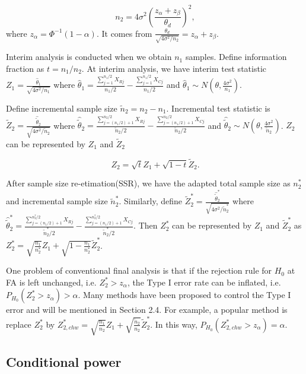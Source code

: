 \documentclass[12pt]{article}
\begin{document}
$$n_2=4\sigma^2(\frac{z_{\alpha}+z_{\beta}}{\theta_d})^2,$$
where $z_{\alpha} = \Phi^{-1}(1 - \alpha)$. It comes from
$\frac{\theta_d}{\sqrt{4\sigma^2/n_2}}=z_{\alpha}+z_{\beta}$.

Interim analysis is conducted when we obtain $n_1$ samples. Define
information fraction as $t=n_1/n_2$. At interim analysis, we have
interim test statistic $Z_1 =
\frac{\hat{\theta}_1}{\sqrt{4\sigma^2/n_1}}$ where $\hat{\theta}_1 =
\frac{\sum_{j=1}^{n_1/2} X_{Rj}}{n_1/2} - \frac{\sum_{j=1}^{n_1/2}
X_{Cj}}{n_1/2}$ and $\hat{\theta}_1 \sim N(\theta,
\frac{4\sigma^2}{n_1})$.

Define incremental sample size $\tilde{n}_2=n_2-n_1$. Incremental test
statistic is $\tilde{Z}_2 =
\frac{\hat{\tilde{\theta}}_2}{\sqrt{4\sigma^2/\tilde{n}_2}}$ where
$\hat{\tilde{\theta}}_2 = \frac{\sum_{j=(n_1/2)+1}^{n_2/2}
X_{Rj}}{\tilde{n}_2/2} - \frac{\sum_{j=(n_1/2)+1}^{n_2/2}
X_{Cj}}{\tilde{n}_2/2}$ and $\hat{\tilde{\theta}}_2 \sim N(\theta,
\frac{4\sigma^2}{\tilde{n}_2})$. $Z_2$ can be represented by $Z_1$ and
$\tilde{Z}_2$

$$Z_2 = \sqrt{t}Z_1 + \sqrt{1-t}\tilde{Z}_2.$$

After sample size re-etimation(SSR), we have the adapted total sample
size as $n_{2}^{*}$ and incremental sample size
$\tilde{n}_{2}^{*}$. Similarly, define $\tilde{Z}_{2}^{*} =
\frac{\hat{\tilde{\theta}}_{2}^{*}}{\sqrt{4\sigma^2/\tilde{n}_{2}^{*}}}$
where $\hat{\tilde{\theta}}_{2}^{*} =
\frac{\sum_{j=(n_1/2)+1}^{n_{2}^{*}/2} X_{Rj}}{\tilde{n}_{2}^{*}/2} -
\frac{\sum_{j=(n_1/2)+1}^{n_{2}^{*}/2}
X_{Cj}}{\tilde{n}_{2}^{*}/2}$. Then $Z_{2}^{*}$ can be represented by
$Z_1$ and $\tilde{Z}_{2}^{*}$ as $Z_{2}^{*} =
\sqrt{\frac{n_1}{n_{2}^{*}}}Z_1 +
\sqrt{1-\frac{n_1}{n_{2}^{*}}}\tilde{Z}_{2}^{*}$.

One problem of conventional final analysis is that if the rejection
rule for $H_0$ at FA is left unchanged, i.e. $Z_{2}^{*}>z_{\alpha}$,
the Type I error rate can be inflated,
i.e.$P_{H_0}(Z_{2}^{*}>z_{\alpha})>\alpha$. Many methods have been
proposed to control the Type I error and will be mentioned in Section
2.4. For example, a popular method is replace $Z_{2}^{*}$ by
$Z_{2,chw}^{*} = \sqrt{\frac{n_1}{n_{2}}}Z_1 +
\sqrt{\frac{\tilde{n}_2}{n_2}}\tilde{Z}_{2}^{*}$. In this way,
$P_{H_0}(Z_{2,chw}^{*}>z_{\alpha})=\alpha$.


\subsection{Conditional power}
\end{document}
